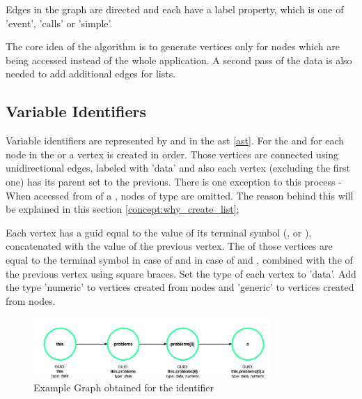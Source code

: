 Edges in the graph are directed and each have a label property, which is one of 'event', 'calls' or 'simple'. 

The core idea of the algorithm is to generate vertices only for nodes which are being accessed instead of the whole application. A second pass of the data is also needed to add additional edges for lists. 

\subsection{Variable Identifiers}
\label{concept:variable_identifiers}
Variable identifiers are represented by  and  in the \gls{ast} \ref{ast}. For the  and for each  node in the  or  a vertex is created in order. 
Those vertices are connected using unidirectional edges, labeled with 'data' and also each vertex (excluding the first one) has its parent set to the previous. There is one exception to this process - When accessed from  of a , nodes of type  are omitted. The reason behind this will be explained in this section \ref{concept:why_create_list};


Each vertex has a \gls{guid} equal to the value of its terminal symbol (,  or ), concatenated with the value of the previous vertex.
The  of those vertices are equal to the terminal symbol in case of  and in case of  and , combined with the  of the previous vertex using square braces. Set the type of each vertex to 'data'. Add the type 'numeric' to vertices created from  nodes and 'generic' to vertices created from  nodes. 

\begin{figure}[H]
    \includegraphics[width=0.8\textwidth]{images/graph_simple.png}
     \caption{Example Graph obtained for the identifier  }
     \label{fig:graph_simple}
\end{figure}

